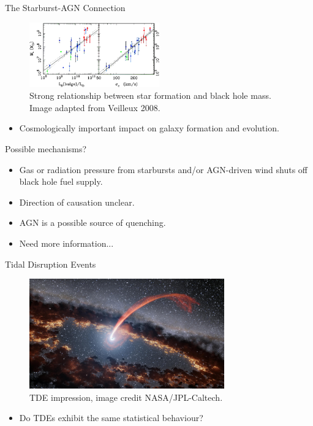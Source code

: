 \documentclass{beamer}
\begin{document}
\begin{frame}{The Starburst-AGN Connection}
  \begin{figure}
    \centering
    \includegraphics[width=0.5\textwidth]{image--002}
    \caption{Strong relationship between star formation and black hole mass. Image adapted from Veilleux 2008.}
  \end{figure}

  \begin{itemize}
    \item Cosmologically important impact on galaxy formation and evolution.
  \end{itemize}
\end{frame}

\begin{frame}{Possible mechanisms?}
  \begin{itemize}
    \item Gas or radiation pressure from starbursts and/or AGN-driven wind shuts off  black hole fuel supply.
    \item Direction of causation unclear.
    \item AGN is a possible source of quenching.
    \item Need more information...
  \end{itemize}
\end{frame}

\begin{frame}{Tidal Disruption Events}
  \begin{figure}
    \includegraphics[width=0.75\textwidth]{tidal_disruption_event}
    \caption{TDE impression, image credit NASA/JPL-Caltech.}
    \label{img:tde_impression}
  \end{figure}
  \begin{itemize}
    \item Do TDEs exhibit the same statistical behaviour?
  \end{itemize}
\end{frame}
\end{document}
